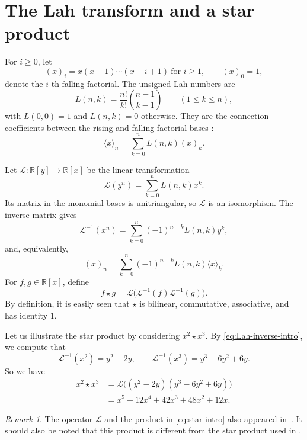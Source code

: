 \documentclass[12pt,a4paper,reqno]{amsart}
\numberwithin{equation}{section}
\theoremstyle{definition}
\theoremstyle{remark}
\newtheorem{remark}[theorem]{Remark}
\newcommand{\R}{\mathbb R}
\newcommand{\Lah}{\mathcal L}
\begin{document}
 

 

\section{The Lah transform and a star product}\label{sec:lah}

For $i\geq0$, let
\[
 (x)_i=x(x-1)\cdots(x-i+1)\ \text{for $i\geq 1$},
 \qquad (x)_0=1,
\]
denote the $i$-th falling factorial.  The unsigned Lah numbers are
\[
 L(n,k)=\frac{n!}{k!}\binom{n-1}{k-1}
 \qquad(1\leq k\leq n),
\]
with $L(0,0)=1$ and $L(n,k)=0$ otherwise.  They are the connection
coefficients between the rising and falling factorial bases
\cite[p.~156, item~2]{Comtet}:
\begin{equation*}
 \langle x\rangle_n=\sum_{k=0}^{n}L(n,k)(x)_k.
\end{equation*}

Let $\Lah:\R[y]\to\R[x]$ be the linear transformation
\begin{equation*}
 \Lah(y^n)=\sum_{k=0}^{n}L(n,k)x^k.
\end{equation*}
Its matrix in the monomial bases is unitriangular, so $\Lah$ is an
isomorphism.  The inverse matrix gives
\begin{equation}\label{eq:Lah-inverse-intro}
 \Lah^{-1}(x^n)=\sum_{k=0}^{n}(-1)^{n-k}L(n,k)y^k,
\end{equation}
and, equivalently,
\begin{equation}\label{eq:inverse-factorial-change}
 (x)_n=\sum_{k=0}^{n}(-1)^{n-k}L(n,k)\langle x\rangle_k.
\end{equation}
For $f,g\in\R[x]$, define
\begin{equation}\label{eq:star-intro}
 f\star g=\Lah\bigl(\Lah^{-1}(f)\Lah^{-1}(g)\bigr).
\end{equation}
By definition, it is easily seen that  $\star$ is bilinear, commutative, associative, and has identity $1$.

Let us   illustrate the star product 
by considering $x^2\star x^3 $. 
By \eqref{eq:Lah-inverse-intro},
we compute that 
\[
 \Lah^{-1}(x^2)=y^2-2y,
 \qquad
 \Lah^{-1}(x^3)=y^3-6y^2+6y.
\]
So we have 
\begin{align*}
 x^2\star x^3
 &=\Lah\bigl((y^2-2y)(y^3-6y^2+6y)\bigr)\\
 &=x^5+12x^4+42x^3+48x^2+12x.
\end{align*}

\begin{remark}
The operator $\Lah$ and the product in \eqref{eq:star-intro} also appeared in~\cite{Jum25}. It should also be noted that this product is different from the star product used in
\cite[Proposition~5.2]{BRW94}.
\end{remark}
\end{document}
